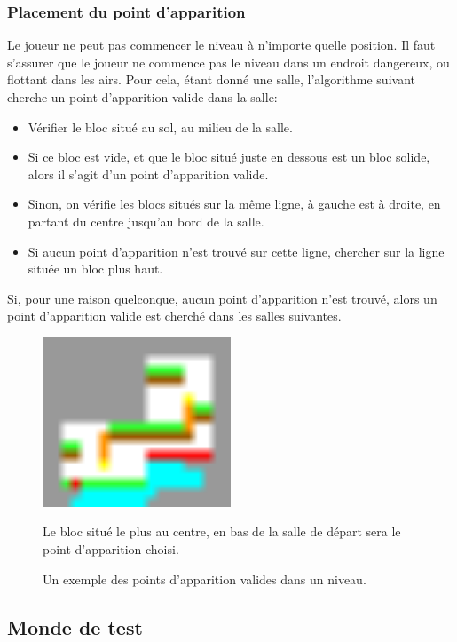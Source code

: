 \documentclass[10pt]{report}
\begin{document}
\subsubsection{Placement du point d'apparition}
\label{subsubsec:spawn_point}

Le joueur ne peut pas commencer le niveau à n'importe quelle position.
Il faut s'assurer que le joueur ne commence pas le niveau dans un endroit dangereux, ou flottant dans les airs.
Pour cela, étant donné une salle, l'algorithme suivant cherche un point d'apparition valide dans la salle:

\begin{itemize}
  \item Vérifier le bloc situé au sol, au milieu de la salle.
  \item Si ce bloc est vide, et que le bloc situé juste en dessous est un bloc solide, alors il s'agit d'un
  point d'apparition valide.
  \item Sinon, on vérifie les blocs situés sur la même ligne, à gauche est à droite, en partant du centre jusqu'au
  bord de la salle.
  \item Si aucun point d'apparition n'est trouvé sur cette ligne, chercher sur la ligne située un bloc plus haut.
\end{itemize}

Si, pour une raison quelconque, aucun point d'apparition n'est trouvé, alors un point d'apparition valide est
cherché dans les salles suivantes.

\begin{figure}[H]
  \centering
  \includegraphics[width=0.5\textwidth]{images/valid_spawn_locations}
  \caption{Un exemple des points d'apparition valides dans un niveau.}
  Le bloc situé le plus au centre, en bas de la salle de départ sera le point d'apparition choisi.
  \label{fig:spawn_points}
\end{figure}

\subsection{Monde de test}
\end{document}
